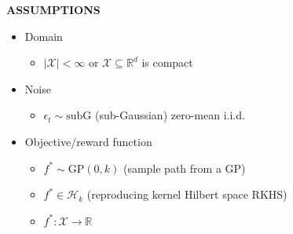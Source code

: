 \begin{whitebox}{\textbf{ASSUMPTIONS}}
    \begin{itemize}
        \item Domain
        \begin{itemize}
            \item $|\mathcal{X}|<\infty$ or $\mathcal{X}\subseteq\mathbb{R}^d$ is compact
        \end{itemize}
        \item Noise
        \begin{itemize}
            \item $\epsilon_t\sim\mathrm{subG}$ (sub-Gaussian) zero-mean i.i.d.
        \end{itemize}
        \item Objective/reward function
        \begin{itemize}
            \item $f^*\sim\mathrm{GP}(0,k)$ (sample path from a GP)
            \item $f^*\in\mathcal{H}_k$ (reproducing kernel Hilbert space RKHS)
            \item $f^*:\mathcal{X}\to\mathbb{R}$
        \end{itemize}
    \end{itemize}
\end{whitebox}

